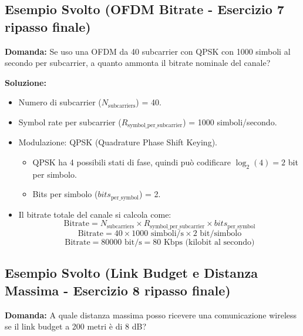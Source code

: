 \subsection{Esempio Svolto (OFDM Bitrate - Esercizio 7 ripasso finale)}
\textbf{Domanda:} Se uso una OFDM da 40 subcarrier con QPSK con 1000 simboli al secondo per subcarrier, a quanto ammonta il bitrate nominale del canale?

\textbf{Soluzione:}
\begin{itemize}
    \item Numero di subcarrier ($N_{\text{subcarriers}}$) = 40.
    \item Symbol rate per subcarrier ($R_{\text{symbol\_per\_subcarrier}}$) = 1000 simboli/secondo.
    \item Modulazione: QPSK (Quadrature Phase Shift Keying).
    \begin{itemize}
        \item QPSK ha 4 possibili stati di fase, quindi può codificare $\log_2(4) = 2$ bit per simbolo.
        \item Bits per simbolo ($bits_{\text{per\_symbol}}$) = 2.
    \end{itemize}
    \item Il bitrate totale del canale si calcola come:
    \[ \text{Bitrate} = N_{\text{subcarriers}} \times R_{\text{symbol\_per\_subcarrier}} \times bits_{\text{per\_symbol}} \]
    \[ \text{Bitrate} = 40 \times 1000 \text{ simboli/s} \times 2 \text{ bit/simbolo} \]
    \[ \text{Bitrate} = 80000 \text{ bit/s} = 80 \text{ Kbps (kilobit al secondo)} \]
\end{itemize}

\subsection{Esempio Svolto (Link Budget e Distanza Massima - Esercizio 8 ripasso finale)}
\textbf{Domanda:} A quale distanza massima posso ricevere una comunicazione wireless se il link budget a 200 metri è di 8 dB?

